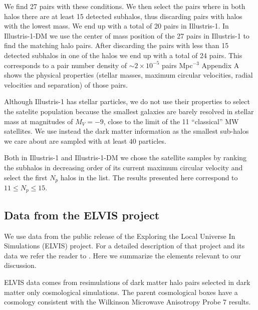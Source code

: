 \documentclass[a4paper,fleqn,usenatbib]{mnras}
\begin{document}
We find 27 pairs with these conditions. 
We then select the pairs where in both halos there are at least 15
detected subhalos, thus discarding pairs with halos with the lowest
mass.
We end up with a total of 20 pairs in Illustris-1.
In Illustris-1-DM we use the center of mass position of the 27 pairs
in Illustris-1 to find the matching halo pairs.
After discarding the pairs with less than 15 detected subhalos in one
of the halos we end up with a total of 24 pairs. 
This corresponds to a pair number density of $\sim 2 \times10^{-5}$
pairs Mpc$^{-3}$ 
Appendix A shows the physical  properties (stellar masses, maximum
circular velocities, radial velocities and separation) of those
pairs.

Although Illustris-1 has stellar particles, we do not use their
properties to select the satelite population because the smallest
galaxies are barely resolved in stellar mass at magnitudes of
$M_V=-9$, close to the limit of the 11 ``classical'' MW satellites.
We use instead the dark matter information as the smallest sub-halos
we care about are sampled with at least $40$ particles.  

Both in Illustris-1 and Illustris-1-DM we chose the satellite samples
by ranking the subhalos in decreasing order of its current maximum
circular velocity and select the first $N_p$ halos in the list.  
The results presented here correspond to $11\leq N_p\leq 15$. 

\subsection{Data from the ELVIS project}
\label{sim:ELVIS}

We use data from the public release of the Exploring the Local
Universe In Simulations (ELVIS) project.
For a detailed description of that project and its data we refer the
reader to \cite{2014MNRAS.438.2578G}. 
Here we summarize the elements relevant to our discussion.

ELVIS data comes from resimulations of dark matter halo pairs selected
in dark matter only cosmological simulations. 
The parent cosmological boxes have a cosmology consistent with the
Wilkinson Microwave Anisotropy Probe 7 results.
\end{document}
